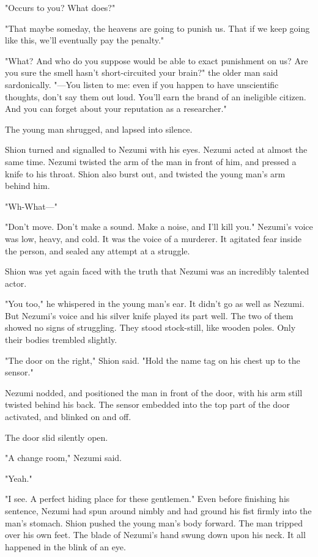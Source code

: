 "Occurs to you? What does?"

"\el That maybe someday, the heavens are going to punish us. That if we
keep going like this, we'll eventually pay the penalty."

"What? And who do you suppose would be able to exact punishment on us?
Are you sure the smell hasn't short-circuited your brain?" the older man
said sardonically. "---You listen to me: even if you happen to have
unscientific thoughts, don't say them out loud. You'll earn the brand of
an ineligible citizen. And you can forget about your reputation as a
researcher."

The young man shrugged, and lapsed into silence.

Shion turned and signalled to Nezumi with his eyes. Nezumi acted at
almost the same time. Nezumi twisted the arm of the man in front of him,
and pressed a knife to his throat. Shion also burst out, and twisted the
young man's arm behind him.

"Wh-What---"

"Don't move. Don't make a sound. Make a noise, and I'll kill you."
Nezumi's voice was low, heavy, and cold. It was the voice of a murderer.
It agitated fear inside the person, and sealed any attempt at a
struggle.

Shion was yet again faced with the truth that Nezumi was an incredibly
talented actor.

"You too," he whispered in the young man's ear. It didn't go as well as
Nezumi. But Nezumi's voice and his silver knife played its part well.
The two of them showed no signs of struggling. They stood stock-still,
like wooden poles. Only their bodies trembled slightly.

"The door on the right," Shion said. "Hold the name tag on his chest up
to the sensor."

Nezumi nodded, and positioned the man in front of the door, with his arm
still twisted behind his back. The sensor embedded into the top part of
the door activated, and blinked on and off.

The door slid silently open.

"A change room," Nezumi said.

"Yeah."

"I see. A perfect hiding place for these gentlemen." Even before
finishing his sentence, Nezumi had spun around nimbly and had ground his
fist firmly into the man's stomach. Shion pushed the young man's body
forward. The man tripped over his own feet. The blade of Nezumi's hand
swung down upon his neck. It all happened in the blink of an eye.

